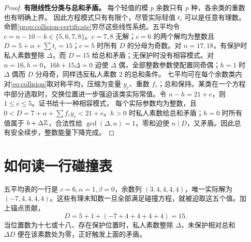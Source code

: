 \begin{proof}
\par\noindent\textbf{有限线性分类与总和矛盾。}
每个轻值的模 $p$ 余数只有 $p$ 种，各余类的重数也有明确上界。
因此方程模式只有有限个，尽管实际轻值 $t_i$ 可以是任意有理数。
命题\ref{prop:collision-certificate}穷尽这些线性系统。五平均令 $c=n-10-h\in\{5,6,7,8\}$。$c=7,8$ 无解；$c=6$ 的两个解均为整数且 $D=5+\alpha+\sum t_i=15$；$c=5$ 时所有 $D$ 的分母为奇数。对 $n=17,18$，有保护时私人素数整除 $\Delta$，而 $D=15$ 给总和矛盾；无保护时没有相容模式。对 $n=16,h=0$，$16b+15\Delta=0$ 迫使 $\Delta$ 偶，全部整数参数使配置同奇偶；$h=1$ 时 $\Delta$ 偶而 $D$ 分母奇，同样违反私人素数 $2$ 的总和条件。
七平均可在每个余数类内对\eqref{eq:collision}取对称平均，压缩为变量 $y_r$、重数 $f_r$；总和保持。某类在一个方程中部分选取时，交换位置进一步强迫该类实际常值。令 $n-h=21+e$，则 $1\le e\le5$。证书给十一种相容模式，
每个实际参数均为整数，且 $0<D=7+\alpha+\sum f_ry_r<21+e$。$h>0$ 时私人素数给总和矛盾；$h=0$ 时所有值属于 $b+\Delta\mathbb Z$，合法性给 $\gcd(\Delta,n)=1$，零和迫使 $n\mid D$，又矛盾。因此总有安全续步，整数能量下降完成。
\end{proof}

\section{如何读一行碰撞表}
五平均表的一行是 $c=6,\alpha=1,\beta=0$，余数列 $(3,4,4,4,4)$，唯一实际解为 $(-7,4,4,4,4)$。这些有理未知数一旦全部满足碰撞方程，就被迫取这五个值。加上锚点贡献，
\[D=5+1+(-7+4+4+4+4)=15.
\]
当位置数为十七或十八、存在保护位置时，私人素数整除 $\Delta$，未保护相对总和 $\Delta D$ 便在该素数处为零，正好触发上面的矛盾。

